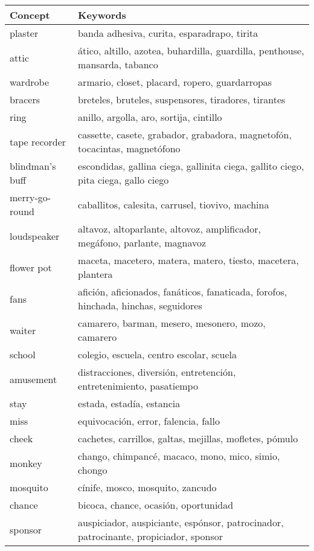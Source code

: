 \documentclass[11pt]{article}
\begin{document}
\begin{table}[t]
\begin{center}
\begin{tabularx}{\linewidth}{l X}
\hline \bf Concept & \bf Keywords \\ \hline
plaster & banda adhesiva, curita, esparadrapo, tirita \\
attic & ático, altillo, azotea, buhardilla, guardilla, penthouse, mansarda, tabanco \\
wardrobe & armario, closet, placard, ropero, guardarropas \\
bracers & breteles, bruteles, suspensores, tiradores, tirantes \\
ring & anillo, argolla, aro, sortija, cintillo \\
tape recorder & cassette, casete, grabador, grabadora, magnetofón, tocacintas, magnetófono \\
blindman’s buff  & escondidas, gallina ciega, gallinita ciega, gallito ciego, pita ciega, gallo ciego \\
merry-go-round & caballitos, calesita, carrusel, tiovivo, machina \\
loudspeaker & altavoz, altoparlante, altovoz, amplificador, megáfono, parlante, magnavoz \\
flower pot & maceta, macetero, matera, matero, tiesto, macetera, plantera \\
fans & afición, aficionados, fanáticos, fanaticada, forofos, hinchada, hinchas, seguidores \\
waiter & camarero, barman, mesero, mesonero, mozo, camarero \\
school & colegio, escuela, centro escolar, scuela \\
amusement & distracciones, diversión, entretención, entretenimiento, pasatiempo \\
stay & estada, estadía, estancia \\
miss & equivocación, error, falencia, fallo \\
cheek & cachetes, carrillos, galtas, mejillas, mofletes, pómulo \\
monkey & chango, chimpancé, macaco, mono, mico, simio, chongo \\
mosquito & cínife, mosco, mosquito, zancudo \\
chance & bicoca, chance, ocasión, oportunidad \\
sponsor & auspiciador, auspiciante, espónsor, patrocinador, patrocinante, propiciador, sponsor \\
\hline
\end{tabularx}
\end{center}
\end{table}
\end{document}
